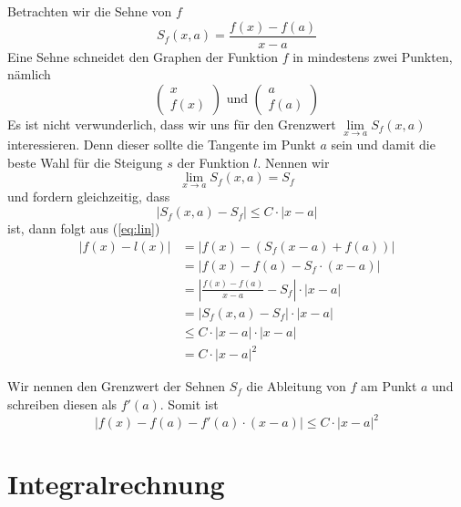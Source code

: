 Betrachten wir die Sehne von $f$
\begin{equation*}
S_f(x,a) = \frac{f(x)-f(a)}{x-a}
\end{equation*}
Eine Sehne schneidet den Graphen der Funktion $f$ in mindestens zwei Punkten, nämlich
\[
\begin{pmatrix}
x\\
f(x)
\end{pmatrix} \text{ und }
\begin{pmatrix}
a\\
f(a)
\end{pmatrix}
\]
Es ist nicht verwunderlich, dass wir uns für den Grenzwert $\lim\limits_{x\rightarrow a} S_f(x,a)$ interessieren. Denn dieser sollte die Tangente im Punkt $a$ sein und damit die beste Wahl für die Steigung $s$ der Funktion $l$. Nennen wir 
\[
\lim\limits_{x\rightarrow a} S_f(x,a) = S_f
\]
und fordern gleichzeitig, dass 
\[
|S_f(x,a) - S_f| \le C\cdot |x-a|
\]
ist, dann folgt aus (\ref{eq:lin})
\begin{equation}
\begin{split}
|f(x)-l(x)| &= |f(x)-(S_f(x-a)+f(a))| \\
&= |f(x)-f(a) -S_f\cdot (x-a)| \\
&= \left| \frac{f(x)-f(a)}{x-a} -S_f \right| \cdot |x-a| \\
&= \left| S_f(x,a) -S_f \right| \cdot |x-a| \\
&\le C\cdot |x-a| \cdot |x-a| \\
&= C\cdot |x-a|^2
\end{split}
\end{equation}

Wir nennen den Grenzwert der Sehnen $S_f$ die Ableitung von $f$ am Punkt $a$ und schreiben diesen als $f'(a)$. Somit ist
\[
|f(x)-f(a) -f'(a)\cdot (x-a)| \le C\cdot |x-a|^2
\]




\chapter{Integralrechnung}


